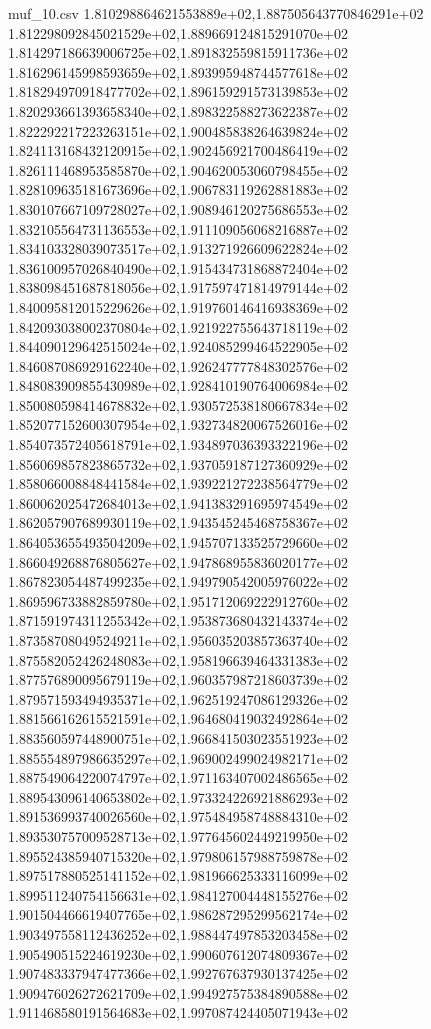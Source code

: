 \begin{filecontents*}{muf_10.csv}
1.810298864621553889e+02,1.887505643770846291e+02
1.812298092845021529e+02,1.889669124815291070e+02
1.814297186639006725e+02,1.891832559815911736e+02
1.816296145998593659e+02,1.893995948744577618e+02
1.818294970918477702e+02,1.896159291573139853e+02
1.820293661393658340e+02,1.898322588273622387e+02
1.822292217223263151e+02,1.900485838264639824e+02
1.824113168432120915e+02,1.902456921700486419e+02
1.826111468953585870e+02,1.904620053060798455e+02
1.828109635181673696e+02,1.906783119262881883e+02
1.830107667109728027e+02,1.908946120275686553e+02
1.832105564731136553e+02,1.911109056068216887e+02
1.834103328039073517e+02,1.913271926609622824e+02
1.836100957026840490e+02,1.915434731868872404e+02
1.838098451687818056e+02,1.917597471814979144e+02
1.840095812015229626e+02,1.919760146416938369e+02
1.842093038002370804e+02,1.921922755643718119e+02
1.844090129642515024e+02,1.924085299464522905e+02
1.846087086929162240e+02,1.926247777848302576e+02
1.848083909855430989e+02,1.928410190764006984e+02
1.850080598414678832e+02,1.930572538180667834e+02
1.852077152600307954e+02,1.932734820067526016e+02
1.854073572405618791e+02,1.934897036393322196e+02
1.856069857823865732e+02,1.937059187127360929e+02
1.858066008848441584e+02,1.939221272238564779e+02
1.860062025472684013e+02,1.941383291695974549e+02
1.862057907689930119e+02,1.943545245468758367e+02
1.864053655493504209e+02,1.945707133525729660e+02
1.866049268876805627e+02,1.947868955836020177e+02
1.867823054487499235e+02,1.949790542005976022e+02
1.869596733882859780e+02,1.951712069222912760e+02
1.871591974311255342e+02,1.953873680432143374e+02
1.873587080495249211e+02,1.956035203857363740e+02
1.875582052426248083e+02,1.958196639464331383e+02
1.877576890095679119e+02,1.960357987218603739e+02
1.879571593494935371e+02,1.962519247086129326e+02
1.881566162615521591e+02,1.964680419032492864e+02
1.883560597448900751e+02,1.966841503023551923e+02
1.885554897986635297e+02,1.969002499024982171e+02
1.887549064220074797e+02,1.971163407002486565e+02
1.889543096140653802e+02,1.973324226921886293e+02
1.891536993740026560e+02,1.975484958748884310e+02
1.893530757009528713e+02,1.977645602449219950e+02
1.895524385940715320e+02,1.979806157988759878e+02
1.897517880525141152e+02,1.981966625333116099e+02
1.899511240754156631e+02,1.984127004448155276e+02
1.901504466619407765e+02,1.986287295299562174e+02
1.903497558112436252e+02,1.988447497853203458e+02
1.905490515224619230e+02,1.990607612074809367e+02
1.907483337947477366e+02,1.992767637930137425e+02
1.909476026272621709e+02,1.994927575384890588e+02
1.911468580191564683e+02,1.997087424405071943e+02

\end{filecontents*}
